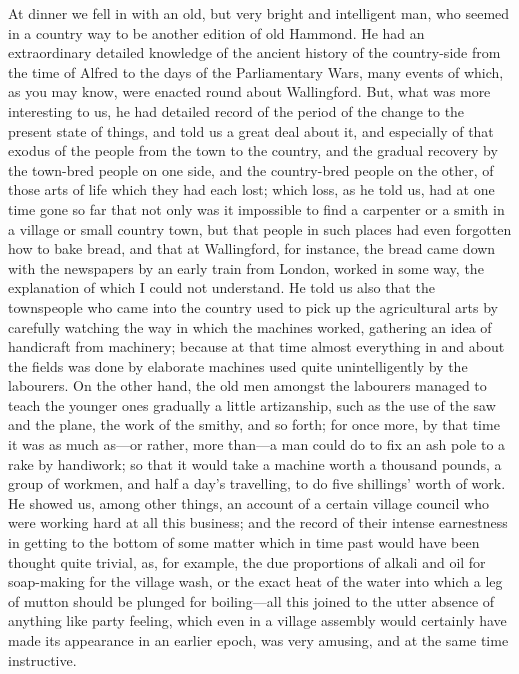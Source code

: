 At dinner we fell in with an old, but very bright and intelligent man,
who seemed in a country way to be another edition of old Hammond. He had
an extraordinary detailed knowledge of the ancient history of the
country-side from the time of Alfred to the days of the Parliamentary
Wars, many events of which, as you may know, were enacted round about
Wallingford. But, what was more interesting to us, he had detailed
record of the period of the change to the present state of things, and
told us a great deal about it, and especially of that exodus of the
people from the town to the country, and the gradual recovery by the
town-bred people on one side, and the country-bred people on the other,
of those arts of life which they had each lost; which loss, as he told
us, had at one time gone so far that not only was it impossible to find
a carpenter or a smith in a village or small country town, but that
people in such places had even forgotten how to bake bread, and that at
Wallingford, for instance, the bread came down with the newspapers by an
early train from London, worked in some way, the explanation of which I
could not understand. He told us also that the townspeople who came into
the country used to pick up the agricultural arts by carefully watching
the way in which the machines worked, gathering an idea of handicraft
from machinery; because at that time almost everything in and about the
fields was done by elaborate machines used quite unintelligently by the
labourers. On the other hand, the old men amongst the labourers managed
to teach the younger ones gradually a little artizanship, such as the
use of the saw and the plane, the work of the smithy, and so forth; for
once more, by that time it was as much as---or rather, more than---a man
could do to fix an ash pole to a rake by handiwork; so that it would
take a machine worth a thousand pounds, a group of workmen, and half a
day's travelling, to do five shillings' worth of work. He showed us,
among other things, an account of a certain village council who were
working hard at all this business; and the record of their intense
earnestness in getting to the bottom of some matter which in time past
would have been thought quite trivial, as, for example, the due
proportions of alkali and oil for soap-making for the village wash, or
the exact heat of the water into which a leg of mutton should be plunged
for boiling---all this joined to the utter absence of anything like
party feeling, which even in a village assembly would certainly have
made its appearance in an earlier epoch, was very amusing, and at the
same time instructive.

